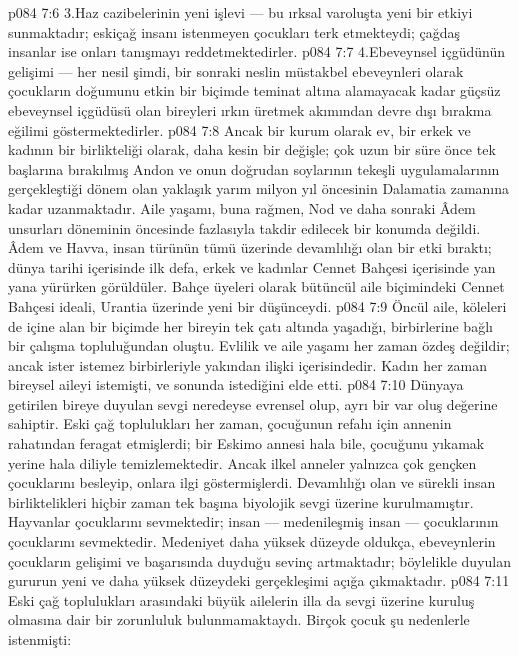 \vs p084 7:6 3.\bibnobreakspace Haz cazibelerinin yeni işlevi --- bu ırksal varoluşta yeni bir etkiyi sunmaktadır; eskiçağ insanı istenmeyen çocukları terk etmekteydi; çağdaş insanlar ise onları tanışmayı reddetmektedirler.
\vs p084 7:7 4.\bibnobreakspace Ebeveynsel içgüdünün gelişimi --- her nesil şimdi, bir sonraki neslin müstakbel ebeveynleri olarak çocukların doğumunu etkin bir biçimde teminat altına alamayacak kadar güçsüz ebeveynsel içgüdüsü olan bireyleri ırkın üretmek akımından devre dışı bırakma eğilimi göstermektedirler.
\vs p084 7:8 Ancak bir kurum olarak ev, bir erkek ve kadının bir birlikteliği olarak, daha kesin bir değişle; çok uzun bir süre önce tek başlarına bırakılmış Andon ve onun doğrudan soylarının tekeşli uygulamalarının gerçekleştiği dönem olan yaklaşık yarım milyon yıl öncesinin Dalamatia zamanına kadar uzanmaktadır. Aile yaşamı, buna rağmen, Nod ve daha sonraki Âdem unsurları döneminin öncesinde fazlasıyla takdir edilecek bir konumda değildi. Âdem ve Havva, insan türünün tümü üzerinde devamlılığı olan bir etki bıraktı; dünya tarihi içerisinde ilk defa, erkek ve kadınlar Cennet Bahçesi içerisinde yan yana yürürken görüldüler. Bahçe üyeleri olarak bütüncül aile biçimindeki Cennet Bahçesi ideali, Urantia üzerinde yeni bir düşünceydi.
\vs p084 7:9 Öncül aile, köleleri de içine alan bir biçimde her bireyin tek çatı altında yaşadığı, birbirlerine bağlı bir çalışma topluluğundan oluştu. Evlilik ve aile yaşamı her zaman özdeş değildir; ancak ister istemez birbirleriyle yakından ilişki içerisindedir. Kadın her zaman bireysel aileyi istemişti, ve sonunda istediğini elde etti.
\vs p084 7:10 Dünyaya getirilen bireye duyulan sevgi neredeyse evrensel olup, ayrı bir var oluş değerine sahiptir. Eski çağ toplulukları her zaman, çocuğunun refahı için annenin rahatından feragat etmişlerdi; bir Eskimo annesi hala bile, çocuğunu yıkamak yerine hala diliyle temizlemektedir. Ancak ilkel anneler yalnızca çok gençken çocuklarını besleyip, onlara ilgi göstermişlerdi. Devamlılığı olan ve sürekli insan birliktelikleri hiçbir zaman tek başına biyolojik sevgi üzerine kurulmamıştır. Hayvanlar çocuklarını sevmektedir; insan --- medenileşmiş insan --- çocuklarının çocuklarını sevmektedir. Medeniyet daha yüksek düzeyde oldukça, ebeveynlerin çocukların gelişimi ve başarısında duyduğu sevinç artmaktadır; böylelikle  duyulan gururun yeni ve daha yüksek düzeydeki gerçekleşimi açığa çıkmaktadır.
\vs p084 7:11 Eski çağ toplulukları arasındaki büyük ailelerin illa da sevgi üzerine kuruluş olmasına dair bir zorunluluk bulunmamaktaydı. Birçok çocuk şu nedenlerle istenmişti:
